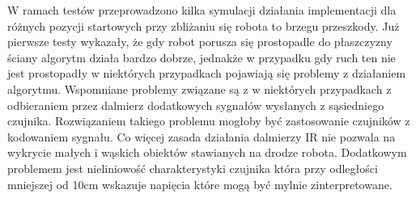 W ramach testów przeprowadzono kilka symulacji działania implementacji dla
różnych pozycji startowych przy zbliżaniu się robota to brzegu przeszkody. Już
pierwsze testy wykazały, że gdy robot porusza się prostopadle do płaszczyzny
ściany algorytm działa bardzo dobrze, jednakże w przypadku gdy ruch ten nie jest
prostopadły w niektórych przypadkach pojawiają się problemy z działaniem
algorytmu. Wspomniane problemy związane są z w niektórych przypadkach z
odbieraniem przez dalmierz dodatkowych sygnałów wysłanych z sąsiedniego czujnika.
Rozwiązaniem takiego problemu mogłoby być zastosowanie czujników z kodowaniem
sygnału. Co więcej zasada działania dalmierzy IR nie pozwala na wykrycie małych i
wąskich obiektów stawianych na drodze robota. Dodatkowym problemem jest
nieliniowość charakterystyki czujnika która przy odległości mniejszej od 10cm
wskazuje napięcia które mogą być mylnie zinterpretowane.
